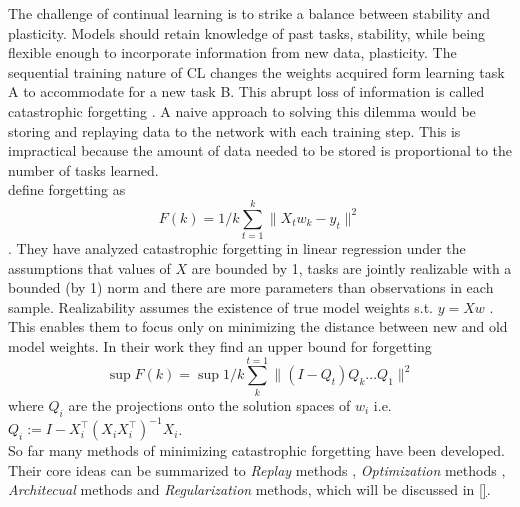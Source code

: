 The challenge of continual learning is to strike a balance between stability and plasticity. Models should retain knowledge of past tasks, stability, while being flexible enough to incorporate information from new data, plasticity. The sequential training nature of CL changes the weights acquired form learning task A to accommodate for a new task B. This abrupt loss of information is called catastrophic forgetting \cite{FRENCH1999128, Mcclelland1995, MCCLOSKEY1989109, Ratcliff1990ConnectionistMO}. A naive approach to solving this dilemma would be storing and replaying data to the network with each training step. This is impractical because the amount of data needed to be stored is proportional to the number of tasks learned.\\
\citeauthor{evron2022} define forgetting as
\begin{equation}
	F(k) = 1/k \sum_{t=1}^{k}\lVert X_t w_k - y_t \rVert^2
\end{equation}.
They have analyzed catastrophic forgetting in linear regression under the assumptions that values of $X$ are bounded by 1, tasks are jointly realizable with a bounded (by 1) norm and there are more parameters than observations in each sample. Realizability assumes the existence of true model weights s.t. $y =Xw$ \cite{Shalev-Shwartz}. This enables them to focus only on minimizing the distance between new and old model weights. In their work they find an upper bound for forgetting
\begin{equation}
	\sup F(k) = \sup 1/k \sum_{k}^{t=1}\lVert(I-Q_t)Q_k ... Q_1\rVert^2
\end{equation}
where $Q_i$ are the projections onto the solution spaces of $w_i$ i.e. $Q_i := I - X_i^\top(X_i X_i^\top)^{-1} X_i$.\\
So far many methods of minimizing catastrophic forgetting have been developed. Their core ideas can be summarized to \textit{Replay} methods \cite{chaudhry2019,rebuffi2017icarlincrementalclassifierrepresentation, aljundi2019gradientbasedsampleselection}, \textit{Optimization} methods \cite{lopezpaz2022gradientepisodicmemorycontinual, javed2019metalearningrepresentationscontinuallearning, mirzadeh2020understandingroletrainingregimes}, \textit{Architecual} methods \cite{mallya2018piggybackadaptingsinglenetwork, ebrahimi2020adversarialcontinuallearning, fernando2017pathnetevolutionchannelsgradient} and \textit{Regularization} methods, which will be discussed in \autoref{}. 
